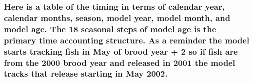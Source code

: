 \documentclass[]{article}
\begin{document}
\hypertarget{here-is-a-table-of-the-timing-in-terms-of-calendar-year-calendar-months-season-model-year-model-month-and-model-age.-the-18-seasonal-steps-of-model-age-is-the-primary-time-accounting-structure.-as-a-reminder-the-model-starts-tracking-fish-in-may-of-brood-year-2-so-if-fish-are-from-the-2000-brood-year-and-released-in-2001-the-model-tracks-that-release-starting-in-may-2002.}{%
\subsubsection{Here is a table of the timing in terms of calendar year,
calendar months, season, model year, model month, and model age. The 18
seasonal steps of model age is the primary time accounting structure. As
a reminder the model starts tracking fish in May of brood year + 2 so if
fish are from the 2000 brood year and released in 2001 the model tracks
that release starting in May
2002.}\label{here-is-a-table-of-the-timing-in-terms-of-calendar-year-calendar-months-season-model-year-model-month-and-model-age.-the-18-seasonal-steps-of-model-age-is-the-primary-time-accounting-structure.-as-a-reminder-the-model-starts-tracking-fish-in-may-of-brood-year-2-so-if-fish-are-from-the-2000-brood-year-and-released-in-2001-the-model-tracks-that-release-starting-in-may-2002.}}
\end{document}
